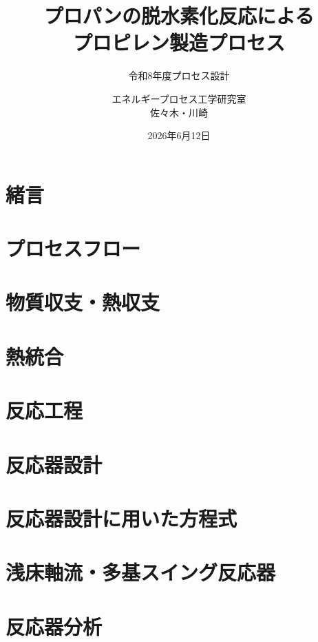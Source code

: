 \documentclass[
  11pt,
  aspectratio=43,           %
  dvipsnames,
]{beamer}
\title{プロパンの脱水素化反応による\texorpdfstring{\\}{}プロピレン製造プロセス}
\subtitle{令和8年度プロセス設計}
\author{エネルギープロセス工学研究室\texorpdfstring{\\}{ }佐々木・川崎}
\date{2026年6月12日}
\begin{document}
\seminartitlepage
\setcounter{framenumber}{0}   %


\section{緒言}


\section{プロセスフロー}


\section{物質収支・熱収支}


\section{熱統合}


\section{反応工程}


\section{反応器設計}


\section{反応器設計に用いた方程式}


\section{浅床軸流・多基スイング反応器}


\section{反応器分析}

\end{document}
